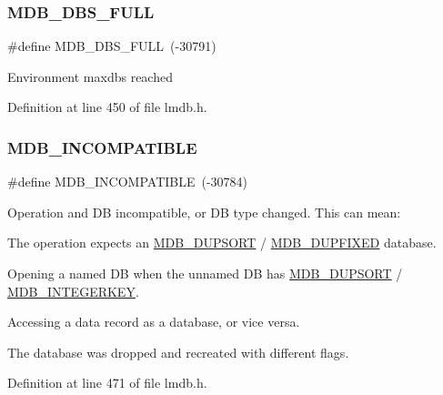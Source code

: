 \subsubsection{\texorpdfstring{M\+D\+B\+\_\+\+D\+B\+S\+\_\+\+F\+U\+LL}{MDB\_DBS\_FULL}}
{\footnotesize\ttfamily \#define M\+D\+B\+\_\+\+D\+B\+S\+\_\+\+F\+U\+LL~(-\/30791)}

Environment maxdbs reached 

Definition at line 450 of file lmdb.\+h.

\mbox{\label{group__errors_gaa39c88fa25b3163b643198f0572a3bee}} 
\subsubsection{\texorpdfstring{M\+D\+B\+\_\+\+I\+N\+C\+O\+M\+P\+A\+T\+I\+B\+LE}{MDB\_INCOMPATIBLE}}
{\footnotesize\ttfamily \#define M\+D\+B\+\_\+\+I\+N\+C\+O\+M\+P\+A\+T\+I\+B\+LE~(-\/30784)}

Operation and DB incompatible, or DB type changed. This can mean\+: 
\begin{DoxyItemize}
\item The operation expects an \mbox{\hyperlink{group__mdb__dbi__open_gae0626566c2562e9007f5c8c9535bab1a}{M\+D\+B\+\_\+\+D\+U\+P\+S\+O\+RT}} / \mbox{\hyperlink{group__mdb__dbi__open_ga5acc26f80668d1ebc31265d178c69338}{M\+D\+B\+\_\+\+D\+U\+P\+F\+I\+X\+ED}} database. 
\item Opening a named DB when the unnamed DB has \mbox{\hyperlink{group__mdb__dbi__open_gae0626566c2562e9007f5c8c9535bab1a}{M\+D\+B\+\_\+\+D\+U\+P\+S\+O\+RT}} / \mbox{\hyperlink{group__mdb__dbi__open_ga219c5c50d41902fca79c68d8836e7753}{M\+D\+B\+\_\+\+I\+N\+T\+E\+G\+E\+R\+K\+EY}}. 
\item Accessing a data record as a database, or vice versa. 
\item The database was dropped and recreated with different flags. 
\end{DoxyItemize}

Definition at line 471 of file lmdb.\+h.

\mbox{\label{group__errors_ga9c2257e8cd8ea027cb682588b235a6f0}} 
